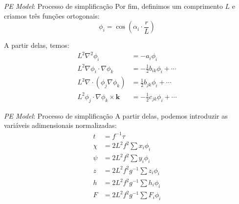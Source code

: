 
\begin{frame}{\textit{PE Model}: Processo de simplificação}
    Por fim, definimos um comprimento $L$ e criamos três funções ortogonais:
    \begin{equation*}
        \phi_i = \cos\left(\alpha_i \cdot \frac{r}{L}\right)
    \end{equation*}

    A partir delas, temos:
    \small
    \begin{align*}
        L^2\nabla^2\phi_i &= -a_i\phi_i \\
        L^2\nabla\phi_i \cdot \nabla\phi_k &= -\frac{1}{2}b_{ik}\phi_i + \cdots \\
        L^2\nabla \cdot (\phi_j\nabla\phi_k) &= \frac{1}{2}b_{jk}\phi_i + \cdots \\
        L^2\phi_j \cdot \nabla\phi_k \times \mathbf{k} &= -\frac{1}{2}c_{jk}\phi_i + \cdots
    \end{align*}
\end{frame}


\begin{frame}{\textit{PE Model}: Processo de simplificação}
    A partir delas, podemos introduzir as variáveis adimensionais normalizadas:
    \begin{align}
        t &= f^{-1}\tau \label{eq:variaveis-adimensionais-inicio}\\
        \chi &= 2L^2f^2 \sum x_i\phi_i \\
        \psi &= 2L^2f^2 \sum y_i\phi_i \\
        z &= 2L^2f^2g^{-1} \sum z_i\phi_i \\
        h &= 2L^2f^2g^{-1} \sum h_i\phi_i \\
        F &= 2L^2f^2g^{-1} \sum F_i\phi_i \label{eq:variaveis-adimensionais-fim}
    \end{align}
\end{frame}



